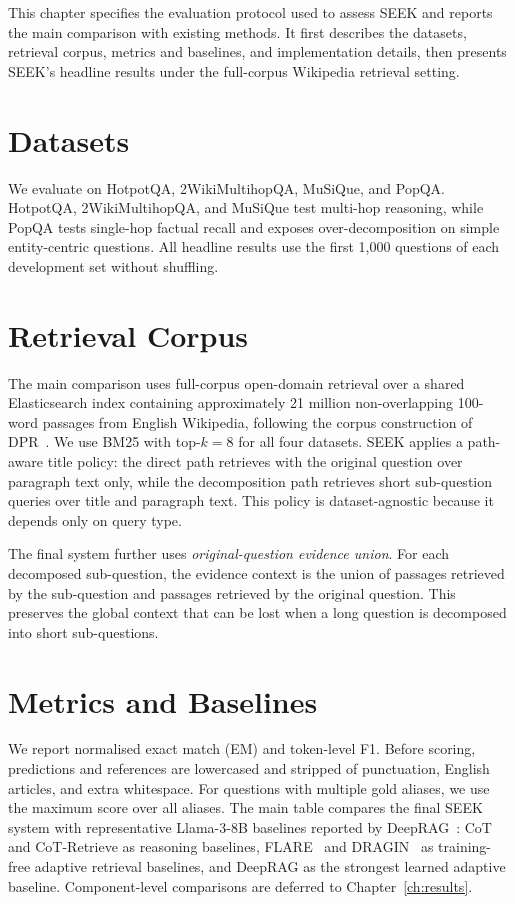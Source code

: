 \documentclass{nthu_thesis}
\begin{document}
\begin{thesiscjk}
This chapter specifies the evaluation protocol used to assess SEEK and reports the main comparison with existing methods. It first describes the datasets, retrieval corpus, metrics and baselines, and implementation details, then presents SEEK's headline results under the full-corpus Wikipedia retrieval setting.

\label{sec:exp-setup}

\section{Datasets}

We evaluate on HotpotQA, 2WikiMultihopQA, MuSiQue, and PopQA. HotpotQA, 2WikiMultihopQA, and MuSiQue test multi-hop reasoning, while PopQA tests single-hop factual recall and exposes over-decomposition on simple entity-centric questions. All headline results use the first 1{,}000 questions of each development set without shuffling.

\section{Retrieval Corpus}

The main comparison uses full-corpus open-domain retrieval over a shared Elasticsearch index containing approximately 21 million non-overlapping 100-word passages from English Wikipedia, following the corpus construction of DPR~\cite{dpr}. We use BM25 with top-$k=8$ for all four datasets. SEEK applies a path-aware title policy: the direct path retrieves with the original question over paragraph text only, while the decomposition path retrieves short sub-question queries over title and paragraph text. This policy is dataset-agnostic because it depends only on query type.

The final system further uses \emph{original-question evidence union}. For each decomposed sub-question, the evidence context is the union of passages retrieved by the sub-question and passages retrieved by the original question. This preserves the global context that can be lost when a long question is decomposed into short sub-questions.

\section{Metrics and Baselines}

We report normalised exact match (EM) and token-level F1. Before scoring, predictions and references are lowercased and stripped of punctuation, English articles, and extra whitespace. For questions with multiple gold aliases, we use the maximum score over all aliases. The main table compares the final SEEK system with representative Llama-3-8B baselines reported by DeepRAG~\cite{deeprag}: CoT and CoT-Retrieve as reasoning baselines, FLARE~\cite{flare} and DRAGIN~\cite{dragin} as training-free adaptive retrieval baselines, and DeepRAG as the strongest learned adaptive baseline. Component-level comparisons are deferred to Chapter~\ref{ch:results}.


\end{thesiscjk}
\end{document}
